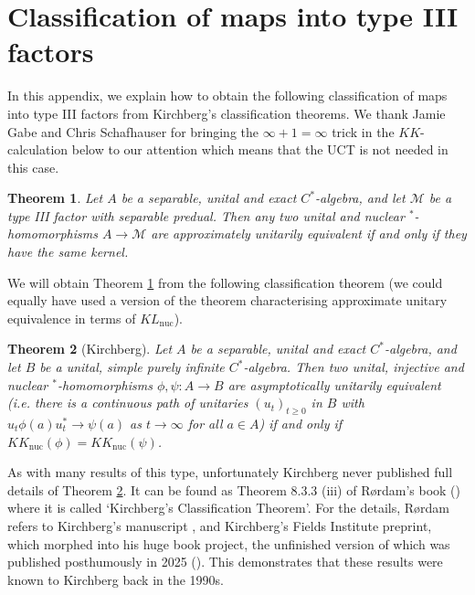 \documentclass[reqno]{amsart}
\newtheorem{thm}{Theorem}[section]
\theoremstyle{definition}
\theoremstyle{remark}
\numberwithin{equation}{section}
\theoremstyle{definition}
\begin{document}
\appendix 
\section{Classification of maps into type III factors} 
\label{Appendix_A} 
In this appendix, we explain how to obtain the following classification of maps into type III factors from Kirchberg's classification theorems. We thank Jamie Gabe and Chris Schafhauser for bringing the $\infty+1=\infty$ trick in the $KK$-calculation below to our attention which means that the UCT is not needed in this case.

\begin{thm}\label{Appendix:Thm}
Let $A$ be a separable, unital and exact $C^*$-algebra, and let $\mathcal M$ be a type III factor with separable predual. Then any two unital and nuclear $^*$-homomorphisms $A\to\mathcal M$ are approximately unitarily equivalent if and only if they have the same kernel.
\end{thm}

We will obtain Theorem \ref{Appendix:Thm} from the following classification theorem (we could equally have used a version of the theorem characterising approximate unitary equivalence in terms of $KL_{\mathrm{nuc}}$).
\begin{thm}[Kirchberg]\label{Kirchberg}
Let $A$ be a separable, unital and exact $C^*$-algebra, and let $B$ be a unital, simple purely infinite $C^*$-algebra.  Then two unital, injective and nuclear $^*$-homomorphisms $\phi,\psi:A\to B$ are asymptotically unitarily equivalent (i.e. there is a continuous path of unitaries $(u_t)_{t\geq 0}$ in $B$ with $u_t\phi(a)u_t^*\to \psi(a)$ as $t\to\infty$ for all $a\in A$) if and only if $KK_{\mathrm{nuc}}(\phi)=KK_{\mathrm{nuc}}(\psi)$.
\end{thm}
 
As with many results of this type, unfortunately Kirchberg never published full details of Theorem \ref{Kirchberg}. It can be found as Theorem 8.3.3 (iii) of R{\o}rdam's book (\cite{Rordam:Book}) where it is called `Kirchberg's Classification Theorem'. For the details, R\o{}rdam refers to Kirchberg's manuscript \cite{Kirchberg99}, and Kirchberg's Fields Institute preprint, which morphed into his huge book project, the unfinished version of which was published posthumously in 2025 (\cite{Kirchberg:Manuscript}). This demonstrates that these results were known to Kirchberg back in the 1990s. 
 
\end{document}
